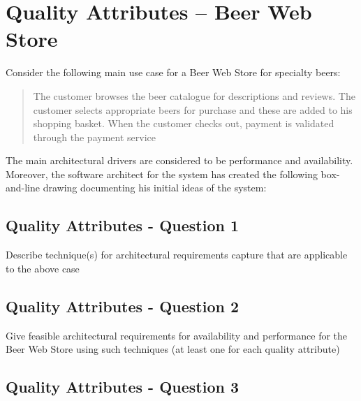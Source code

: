 \section{Quality Attributes -- Beer Web Store}

Consider the following main use case for a Beer Web Store for specialty
beers:

\begin{quote}
  The customer browses the beer catalogue for descriptions and
  reviews. The customer selects appropriate beers for purchase and
  these are added to his shopping basket. When the customer checks
  out, payment is validated through the payment service
\end{quote}
The main architectural drivers are considered to be performance and
availability. Moreover, the software architect for the system has
created the following box-and-line drawing documenting his initial
ideas of the system:
\begin{figure}[h!]
  \centerline{}
\end{figure}

\subsection{Quality Attributes - Question 1}

\begin{question}
Describe technique(s) for architectural requirements capture
that are applicable to the above case
\end{question}


\subsection{Quality Attributes - Question 2}

\begin{question}
Give feasible architectural requirements for availability
and performance for the Beer Web Store using such techniques (at
least one for each quality attribute)
\end{question}


\subsection{Quality Attributes - Question 3}

